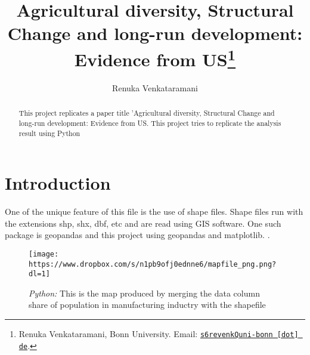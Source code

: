 \documentclass[11pt, a4paper, leqno]{article}
\begin{document}
\title{Agricultural diversity, Structural Change and long-run development: Evidence from US\thanks{Renuka Venkataramani, Bonn University. Email: \href{mailto:s6revenkQuni-bonn.de}{\nolinkurl{s6revenkQuni-bonn [dot] de}}.}}

\author{Renuka Venkataramani}


\maketitle


\begin{abstract}
    This project replicates a paper title 'Agricultural diversity, Structural Change and long-run development: Evidence from US.
    This project tries to replicate the analysis result using Python
    \citet{fiszbein2022agricultural}
\end{abstract}

\clearpage


\section{Introduction} %
\label{sec:introduction}

One of the unique feature of this file is the use of shape files. Shape files run with the extensions shp, shx, dbf, etc and are read using GIS software.
One such package is geopandas and this project using geopandas and matplotlib.
\citet{GaudeckerEconProjectTemplates}.




\begin{figure}[H]

    \centering
    \texttt{[image: https://www.dropbox.com/s/n1pb9ofj0ednne6/mapfile\_png.png?dl=1]}

    \caption{\emph{Python:} This is the map produced by merging the data column share of population in manufacturing
    inductry with the shapefile}
    \label{fig:Mapfile: Share of population in the manufacturing industry}

\end{figure}
\end{document}
